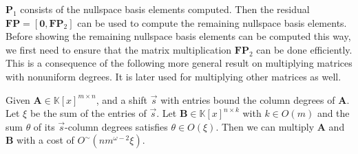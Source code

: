 $\mathbf{P}_{1}$ consists of the nullspace basis elements computed.
Then the residual $\mathbf{F}\mathbf{P}=\left[\mathbf{0},\mathbf{F}\mathbf{P}_{2}\right]$
can be used to compute the remaining nullspace basis elements. Before
showing the remaining nullspace basis elements can be computed this
way, we first need to ensure that the matrix multiplication $\mathbf{F}\mathbf{P}_{2}$
can be done efficiently. This is a consequence of the following more
general result on multiplying matrices with nonuniform degrees. It
is later used for multiplying other matrices as well.
\begin{lem}
\label{lem:multiplyUnbalancedMatrices}Given $\mathbf{A}\in\mathbb{K}\left[x\right]^{m\times n}$,
and a shift $\vec{s}$ with entries bound the column degrees of $\mathbf{A}$.
Let $\xi$ be the sum of the entries of $\vec{s}$. Let $\mathbf{B}\in\mathbb{K}\left[x\right]^{n\times k}$
with $k\in O\left(m\right)$ and the sum $\theta$ of its $\vec{s}$-column
degrees satisfies $\theta\in O\left(\xi\right)$. Then we can multiply
$\mathbf{A}$ and $\mathbf{B}$ with a cost of $O^{\sim}(nm^{\omega-2}\xi)$. \end{lem}

